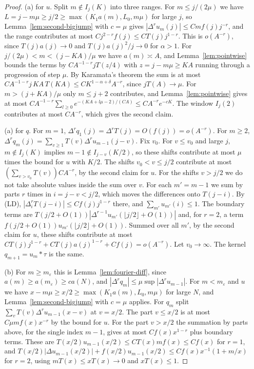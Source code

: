 \begin{proof}
(a) for $u$. Split $m\notin I_j(K)$ into three ranges. For $m\le j/(2\mu)$ we have
$L=j-m\mu\ge j/2\ge\max(K_1a(m),L_0,m\mu)$ for large $j$, so Lemma~\ref{lem:second-bigjump} with $c=\mu$ gives
$|\Delta^ru_m(j)|\le Cmf(j)j^{-r}$, and the range contributes at most $Cj^{2-r}f(j)\le CT(j)j^{1-r}$.
This is $o(A^{-r})$, since $T(j)a(j)\to0$ and $T(j)a(j)^2/j\to0$ for $\alpha>1$. For
$j/(2\mu)<m<(j-KA)/\mu$ we have $a(m)\asymp A$, and Lemma~\ref{lem:pointwise} bounds the terms by
$CA^{-1-r}jT(z/4)$ with $z=j-m\mu\ge KA$ running through a progression of step $\mu$. By
Karamata's theorem the sum is at most $CA^{-1-r}j\,KA\,T(KA)\le CK^{1-\alpha+\delta}A^{-r}$, since
$jT(A)\to\mu$. For $m>(j+KA)/\mu$ only $m\le j+2$ contributes, and Lemma~\ref{lem:pointwise}
gives at most $CA^{-1-r}\sum_{l\ge0}e^{-(KA+l\mu-2)/(CA)}\le CA^{-r}e^{-cK}$. The window $I_j(2)$
contributes at most $CA^{-r}$, which gives the second claim.

(a) for $q$. For $m=1$, $\Delta^rq_1(j)=\Delta^rT(j)=O(f(j))=o(A^{-r})$. For $m\ge2$,
$\Delta^rq_m(j)=\sum_{v\ge1}T(v)\Delta^ru_{m-1}(j-v)$. Fix $v_0$. For $v\le v_0$ and large $j$,
$m\notin I_j(K)$ implies $m-1\notin I_{j-v}(K/2)$, so these shifts contribute at most $\mu$ times
the bound for $u$ with $K/2$. The shifts $v_0<v\le j/2$ contribute at most
$(\sum_{v>v_0}T(v))CA^{-r}$, by the second claim for $u$. For the shifts $v>j/2$ we do not take
absolute values inside the sum over $v$. For each $m'=m-1$ we sum by parts $r$ times in
$i=j-v<j/2$, which moves the differences onto $T(j-i)$. By (LD),
$|\Delta^r_iT(j-i)|\le Cf(j)j^{1-r}$ there, and $\sum_{m'}u_{m'}(i)\le1$. The boundary terms are
$T(j/2+O(1))|\Delta^{r-1}u_{m'}(\lfloor j/2\rfloor+O(1))|$ and, for $r=2$, a term
$f(j/2+O(1))u_{m'}(\lfloor j/2\rfloor+O(1))$. Summed over all $m'$, by the second claim for $u$,
these shifts contribute at most $CT(j)j^{1-r}+CT(j)a(j)^{1-r}+Cf(j)=o(A^{-r})$. Let $v_0\to\infty$.
The kernel $q_{m+1}=u_m*\tau$ is the same.

(b) For $m\ge m_\varepsilon$ this is Lemma~\ref{lem:fourier-diff}, since $a(m)\ge a(m_\varepsilon)\ge ca(N)$,
and $|\Delta^rq_m|\le\mu\sup|\Delta^ru_{m-1}|$. For $m<m_\varepsilon$ and $u$ we have
$x-m\mu\ge x/2\ge\max(K_1a(m),L_0,m\mu)$ for large $N$, and Lemma~\ref{lem:second-bigjump} with $c=\mu$ applies.
For $q_m$ split $\sum_vT(v)\Delta^ru_{m-1}(x-v)$ at $v=x/2$. The part $v\le x/2$ is at most
$C\mu mf(x)x^{-r}$ by the bound for $u$. For the part $v>x/2$ the summation by parts above,
for the single index $m-1$, gives at most $Cf(x)x^{1-r}$ plus boundary terms. These are
$T(x/2)u_{m-1}(x/2)\le CT(x)mf(x)\le Cf(x)$ for $r=1$, and
$T(x/2)|\Delta u_{m-1}(x/2)|+f(x/2)u_{m-1}(x/2)\le Cf(x)x^{-1}(1+m/x)$ for $r=2$, using
$mT(x)\le xT(x)\to0$ and $xT(x)\le1$.


\end{proof}
